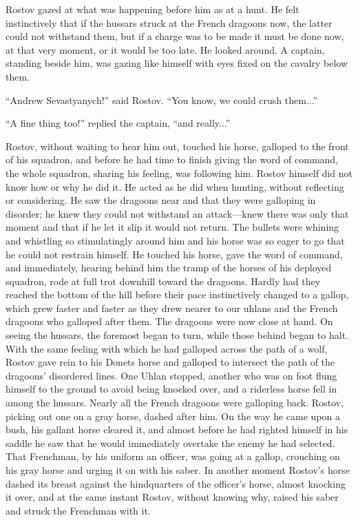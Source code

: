 Rostov gazed at what was happening before him as at a hunt. He
felt instinctively that if the hussars struck at the French
dragoons now, the latter could not withstand them, but if a
charge was to be made it must be done now, at that very moment,
or it would be too late. He looked around. A captain, standing
beside him, was gazing like himself with eyes fixed on the
cavalry below them.

``Andrew Sevastyanych!'' said Rostov. ``You know, we could crush
them...''

``A fine thing too!'' replied the captain, ``and really...''

Rostov, without waiting to hear him out, touched his horse,
galloped to the front of his squadron, and before he had time to
finish giving the word of command, the whole squadron, sharing
his feeling, was following him. Rostov himself did not know how
or why he did it. He acted as he did when hunting, without
reflecting or considering. He saw the dragoons near and that they
were galloping in disorder; he knew they could not withstand an
attack---knew there was only that moment and that if he let it
slip it would not return. The bullets were whining and whistling
so stimulatingly around him and his horse was so eager to go that
he could not restrain himself. He touched his horse, gave the
word of command, and immediately, hearing behind him the tramp of
the horses of his deployed squadron, rode at full trot downhill
toward the dragoons.  Hardly had they reached the bottom of the
hill before their pace instinctively changed to a gallop, which
grew faster and faster as they drew nearer to our uhlans and the
French dragoons who galloped after them. The dragoons were now
close at hand. On seeing the hussars, the foremost began to turn,
while those behind began to halt. With the same feeling with
which he had galloped across the path of a wolf, Rostov gave rein
to his Donets horse and galloped to intersect the path of the
dragoons' disordered lines. One Uhlan stopped, another who was on
foot flung himself to the ground to avoid being knocked over, and
a riderless horse fell in among the hussars. Nearly all the
French dragoons were galloping back. Rostov, picking out one on a
gray horse, dashed after him. On the way he came upon a bush, his
gallant horse cleared it, and almost before he had righted
himself in his saddle he saw that he would immediately overtake
the enemy he had selected. That Frenchman, by his uniform an
officer, was going at a gallop, crouching on his gray horse and
urging it on with his saber. In another moment Rostov's horse
dashed its breast against the hindquarters of the officer's
horse, almost knocking it over, and at the same instant Rostov,
without knowing why, raised his saber and struck the Frenchman
with it.

